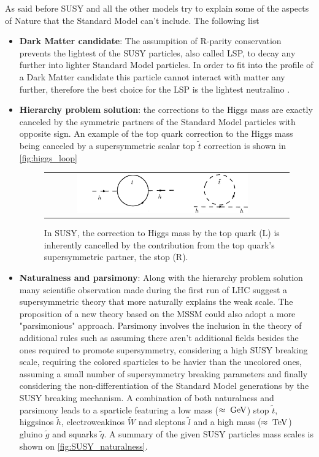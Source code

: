 \FloatBarrier

As said before SUSY and all the other models try to explain some of the aspects of Nature that the Standard Model can't include. The following list 

\begin{itemize}
	\item \textbf{Dark Matter candidate}: The assumpition of R-parity conservation prevents the lightest of the SUSY particles, also called LSP, to decay any further into lighter Standard Model particles. In order to fit into the profile of a Dark Matter candidate this particle cannot interact with matter any further, therefore the best choice for the LSP is the lightest neutralino \neutralinoone.  
	
	\item \textbf{Hierarchy problem solution}:  the corrections to the Higgs mass are exactly canceled by the symmetric partners of the Standard Model particles with opposite sign. An example of the top quark correction to the Higgs mass being canceled by a supersymmetric scalar top $\widetilde{t}$ correction is shown in \autoref{fig:higgs_loop}
	
	\begin{figure}[tbh!]
		\centering
		\begin{tabular}{cc}
			\includegraphics[width=0.75\textwidth]{theory/pics/higgs_loop.png}
		\end{tabular}
		\caption{In SUSY, the correction to Higgs mass by the top quark (L) is inherently cancelled by the contribution from the top quark's supersymmetric partner, the stop (R).}
		\label{fig:higgs_loop}
	\end{figure}

	\item \textbf{Naturalness and parsimony}: Along with the hierarchy problem solution many scientific observation made during the first run of LHC suggest a supersymmetric theory that more naturally explains the weak scale\cite{Craig:2013cxa}. The proposition of a new theory based on the MSSM could also adopt a more "parsimonious" approach. Parsimony involves the inclusion in the theory of additional rules such as assuming there aren't additional fields besides the ones required to promote supersymmetry, considering a high SUSY breaking scale, requiring the colored sparticles to be havier than the uncolored ones, assuming a small number of supersymmetry breaking parameters and finally considering the non-differentiation of the Standard Model generations by the SUSY breaking mechanism. A combination of both naturalness and parsimony leads to a sparticle featuring a low mass ($\approx\;\text{Ge}\kern-0.06667em\text{V}$) stop $\widetilde{t}$, higgsinos $\widetilde{h}$, electroweakinos $\widetilde{W}$ nad sleptons $\widetilde{l}$ and a high mass ($\approx\;\text{Te}\kern-0.06667em\text{V}$) gluino $\widetilde{g}$ and squarks $\widetilde{q}$. A summary of the given SUSY particles mass scales is shown on \autoref{fig:SUSY_naturalness}.


\end{itemize}
